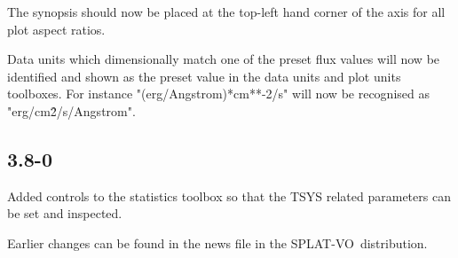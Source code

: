\documentclass[twoside,11pt]{article}
\renewcommand{\_}{\texttt{\symbol{95}}}
\newcommand{\SPLAT}{\textsf{SPLAT-VO}}
\begin{document}
The synopsis should now be placed at the top-left hand corner of the axis for
all plot aspect ratios.

Data units which dimensionally match one of the preset flux values will now be
identified and shown as the preset value in the data units and plot units
toolboxes. For instance "(erg/Angstrom)*cm**-2/s" will now be recognised as
"erg/cm\^2/s/Angstrom".

\subsection{3.8-0}

Added controls to the statistics toolbox so that the TSYS related
parameters can be set and inspected.

Earlier changes can be found in the news file in the \SPLAT\ distribution.
\end{document}
